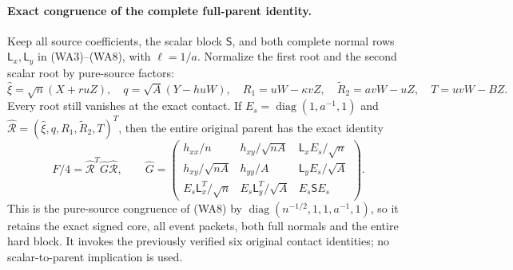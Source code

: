 \paragraph{Exact congruence of the complete full-parent identity.}
Keep all source coefficients, the scalar block $\mathsf S$, and
both complete normal rows $\mathsf L_x,\mathsf L_y$ in
(WA3)--(WA8), with $\ell=1/a$. Normalize the first root and
the second scalar root by pure-source factors:
\[
 \widehat\xi=\sqrt n(X+ruZ),\quad
 q=\sqrt A(Y-huW),\quad
 R_1=uW-\kappa vZ,\quad \widetilde R_2=avW-uZ,\quad T=uvW-BZ.
                                                               \tag{SL2}
\]
Every root still vanishes at the exact contact. If
$E_s=\operatorname{diag}(1,a^{-1},1)$ and
$\widehat{\mathcal R}=(\widehat\xi,q,R_1,\widetilde R_2,T)^T$, then
the entire original parent has the exact identity
\[
 F/4=\widehat{\mathcal R}^{T}\widehat G\widehat{\mathcal R},
 \qquad
 \widehat G=
 \begin{pmatrix}
 h_{xx}/n&h_{xy}/\sqrt{nA}&\mathsf L_x E_s/\sqrt n\\
 h_{xy}/\sqrt{nA}&h_{yy}/A&\mathsf L_y E_s/\sqrt A\\
 E_s\mathsf L_x^T/\sqrt n&E_s\mathsf L_y^T/\sqrt A&E_s\mathsf S E_s
 \end{pmatrix}.                                        \tag{SL3}
\]
This is the pure-source congruence of (WA8) by
$\operatorname{diag}(n^{-1/2},1,1,a^{-1},1)$, so it retains
the exact signed core, all event packets, both full normals and
the entire hard block. It invokes the previously verified six
original contact identities; no scalar-to-parent implication is used.

